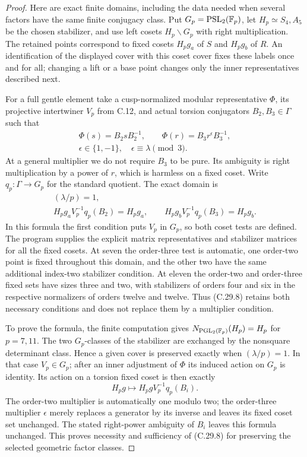 \begin{proof}
Here are exact finite domains, including the data
needed when several factors have the same finite
conjugacy class. Put $G_p=\operatorname{PSL}_2(\mathbb F_p)$,
let $H_p\simeq S_4,A_5$ be the chosen stabilizer,
and use left cosets $H_p\backslash G_p$ with
right multiplication. The retained points correspond
to fixed cosets $H_pg_a$ of $S$ and $H_pg_b$ of
$R$. An identification of the displayed cover with
this coset cover fixes these labels once and for all;
changing a lift or a base point changes only the
inner representatives described next.

For a full gentle element take a cusp-normalized
modular representative $\Phi$, its projective
intertwiner $V_p$ from C.12, and actual torsion
conjugators $B_2,B_3\in\Gamma$ such that
\[
 \begin{gathered}
 \Phi(s)=B_2sB_2^{-1},\qquad
 \Phi(r)=B_3r^\epsilon B_3^{-1},\\
                    \epsilon\in\{1,-1\},\quad
                    \epsilon\equiv\lambda\pmod3.
 \end{gathered}
\]
At a general multiplier we do not require $B_3$
to be pure. Its ambiguity is right multiplication
by a power of $r$, which is harmless on a fixed
coset. Write $q_p:\Gamma\to G_p$ for the
standard quotient. The exact domain is
\[
 \begin{gathered}
 (\lambda/p)=1,\\
 H_pg_aV_p^{-1}q_p(B_2)=H_pg_a,\qquad
 H_pg_bV_p^{-1}q_p(B_3)=H_pg_b .
 \end{gathered}
 \tag{C.29.8}
\]
In this formula the first condition puts $V_p$
in $G_p$, so both coset tests are defined.
The program supplies the explicit matrix representatives
and stabilizer matrices for all the fixed cosets.
At seven the order-three test is automatic, one
order-two point is fixed throughout this domain,
and the other two have the same additional
index-two stabilizer condition. At eleven the
order-two and order-three fixed sets have sizes
three and two, with stabilizers of orders four
and six in the respective normalizers of orders
twelve and twelve. Thus (C.29.8) retains both
necessary conditions and does not replace them
by a multiplier condition.

To prove the formula, the finite computation gives
$N_{\operatorname{PGL}_2(\mathbb F_p)}(H_p)=H_p$ for $p=7,11$.
The two $G_p$-classes of the stabilizer are exchanged
by the nonsquare determinant class. Hence a given
cover is preserved exactly when $(\lambda/p)=1$.
In that case $V_p\in G_p$; after an inner adjustment
of $\Phi$ its induced action on $G_p$ is identity.
Its action on a torsion fixed coset is then exactly
\[
       H_pg\longmapsto H_pgV_p^{-1}q_p(B_i).
\]
The order-two multiplier is automatically one modulo
two; the order-three multiplier $\epsilon$ merely
replaces a generator by its inverse and leaves its
fixed coset set unchanged. The stated right-power
ambiguity of $B_i$ leaves this formula unchanged.
This proves necessity and sufficiency of (C.29.8)
for preserving the selected geometric factor classes.


\end{proof}
